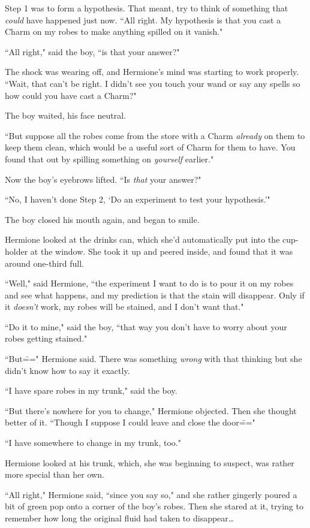 Step 1 was to form a hypothesis. That meant, try to think of something that \emph{could} have happened just now. ``All right. My hypothesis is that you cast a Charm on my robes to make anything spilled on it vanish."

``All right," said the boy, ``is that your answer?"

The shock was wearing off, and Hermione's mind was starting to work properly. ``Wait, that can't be right. I didn't see you touch your wand or say any spells so how could you have cast a Charm?"

The boy waited, his face neutral.

``But suppose all the robes come from the store with a Charm \emph{already} on them to keep them clean, which would be a useful sort of Charm for them to have. You found that out by spilling something on \emph{yourself} earlier."

Now the boy's eyebrows lifted. ``Is \emph{that} your answer?"

``No, I haven't done Step 2, `Do an experiment to test your hypothesis.'"

The boy closed his mouth again, and began to smile.

Hermione looked at the drinks can, which she'd automatically put into the cup-holder at the window. She took it up and peered inside, and found that it was around one-third full.

``Well," said Hermione, ``the experiment I want to do is to pour it on my robes and see what happens, and my prediction is that the stain will disappear. Only if it \emph{doesn't} work, my robes will be stained, and I don't want that."

``Do it to mine," said the boy, ``that way you don't have to worry about your robes getting stained."

``But\===" Hermione said. There was something \emph{wrong} with that thinking but she didn't know how to say it exactly.

``I have spare robes in my trunk," said the boy.

``But there's nowhere for you to change," Hermione objected. Then she thought better of it. ``Though I suppose I could leave and close the door\==="

``I have somewhere to change in my trunk, too."

Hermione looked at his trunk, which, she was beginning to suspect, was rather more special than her own.

``All right," Hermione said, ``since you say so," and she rather gingerly poured a bit of green pop onto a corner of the boy's robes. Then she stared at it, trying to remember how long the original fluid had taken to disappear{\ldots}

